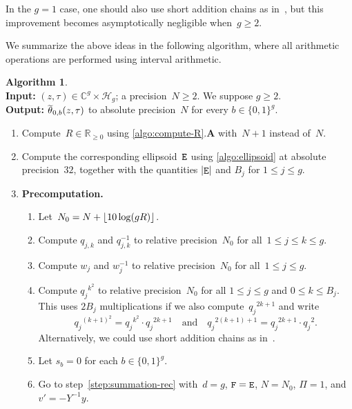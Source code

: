 \documentclass[12pt,oneside]{amsart}
\numberwithin{equation}{section}
\theoremstyle{definition}
\newtheorem{algorithm}[equation]{Algorithm}
\newcommand{\algoinput}[1]{~\\ \noindent\textbf{Input:} #1}
\newcommand{\algooutput}[1]{~\\ \noindent\textbf{Output:} #1}
\newcommand{\R}{\mathbb{R}}
\newcommand{\C}{\mathbb{C}}
\newcommand{\Half}{\mathcal{H}}
\DeclareMathOperator{\E}{\tt E}
\DeclareMathOperator{\eldF}{\tt F}
\DeclareMathOperator{\thetatilde}{\rlap{\raisebox{-0.1ex}{$\widetilde{\phantom{\,t}}$}}\theta}
\DeclarePairedDelimiter{\abs}{|}{|}
\DeclarePairedDelimiter{\floor}{\lfloor}{\rfloor}
\begin{document}
In the $g=1$ case, one should also use short addition chains as
in~\cite{engeShortAdditionSequences2018}, but this improvement becomes
asymptotically negligible when~$g\geq 2$.

We summarize the above ideas in the following algorithm, where all arithmetic
operations are performed using interval arithmetic.

\begin{algorithm}
  \label{algo:summation}
  \algoinput{$(z,\tau)\in \C^g\times \Half_g$; a precision~$N\geq 2$. We
    suppose $g\geq 2$.}  \algooutput{$\thetatilde_{0,b}(z,\tau)$ to absolute
    precision~$N$ for every $b\in \{0,1\}^g$.}

  \begin{enumerate}
  \item \label{step:summation-R} Compute~$R\in \R_{\geq 0}$ using
    \cref{algo:compute-R}.\textbf{A} with~$N+1$ instead of~$N$.
  \item \label{step:summation-eld} Compute the corresponding ellipsoid~$\E$
    using \cref{algo:ellipsoid} at absolute precision~$32$, together with the
    quantities $\abs{\E}$ and $B_j$ for $1\leq j\leq g$.
  \item \label{step:summation-precomp} \textbf{Precomputation.}
    \begin{enumerate}
    \item Let~$N_0 = N + \floor{10 \log(gR)}$.
    \item Compute $q_{j,k}$ and $q_{j,k}^{-1}$ to relative
      precision~$N_0$ for all~$1\leq j\leq k\leq g$.
    \item Compute $w_j$ and $w_j^{-1}$ to relative precision~$N_0$ for all~$1\leq j\leq g$.
    \item Compute ${q_j}^{k^2}$ to relative precision~$N_0$ for all
      $1\leq j\leq g$ and $0\leq k\leq B_j$. This uses $2 B_j$ multiplications
      if we also compute~${q_j}^{2k+1}$ and write
      \begin{displaymath}
        {q_j}^{(k+1)^2} = {q_j}^{k^2} \cdot {q_j}^{2k+1}
        \quad\text{and}\quad
        {q_j}^{2(k+1)+1} = {q_j}^{2k+1} \cdot {q_j}^2.
      \end{displaymath}
      Alternatively, we could use short addition chains as
      in~\cite{engeShortAdditionSequences2018}.
    \item Let $s_b = 0$ for each $b\in \{0,1\}^g$.
    \item Go to step~\eqref{step:summation-rec} with~$d=g$, $\eldF = \E$,
      $N=N_0$, $\Pi=1$, and $v'= -Y^{-1}y$.
    \end{enumerate}

\end{enumerate}
\end{algorithm}
\end{document}
